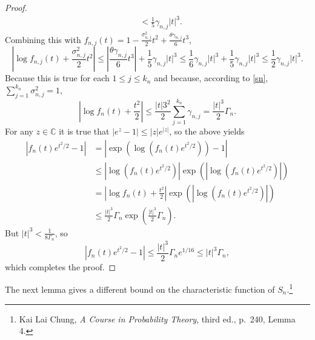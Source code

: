 \documentclass{article}
\theoremstyle{definition}
\begin{document}
\begin{proof}
\begin{align*}
&<\frac{1}{5} \gamma_{n,j} |t|^3.
\end{align*}
Combining this with $f_{n,j}(t) = 1- \frac{\sigma_{n,j}^2}{2} t^2  + \frac{\theta \gamma_{n,j}}{6} t^3$,
\[
\left|\log f_{n,j}(t) + \frac{\sigma_{n,j}^2}{2}t^2 \right| \leq 
\left|\frac{\theta \gamma_{n,j}}{6} t^3 \right| +\frac{1}{5} \gamma_{n,j} |t|^3
\leq \frac{1}{6}\gamma_{n,j} |t|^3 + \frac{1}{5} \gamma_{n,j} |t|^3 \leq 
\frac{1}{2}\gamma_{n,j} |t|^3.
\]
Because this is true for each $1 \leq j \leq k_n$ and because, according to \eqref{sn}, $\sum_{j=1}^{k_n} \sigma_{n,j}^2=1$,
\[
\left|\log f_n(t) + \frac{t^2}{2} \right| \leq \frac{|t|3^2}{2} \sum_{j=1}^{k_n} \gamma_{n,j} = \frac{|t|^3}{2} \Gamma_n.
\]
For any $z \in \mathbb{C}$ it is true that $|e^z - 1| \leq |z| e^{|z|}$, so the above yields
\begin{align*}
|f_n(t) e^{t^2/2} - 1| &= |\exp(\log(f_n(t) e^{t^2/2}))-1|\\
&\leq |\log(f_n(t) e^{t^2/2})| \exp\left(\left|\log(f_n(t) e^{t^2/2})\right|\right)\\
&=\left|\log f_n(t) + \frac{t^2}{2} \right|\exp\left(\left|\log(f_n(t) e^{t^2/2})\right|\right)\\
&\leq
\frac{|t|^3}{2} \Gamma_n   \exp\left(\frac{|t|^3}{2} \Gamma_n \right).
\end{align*}
But $|t|^3 < \frac{1}{8\Gamma_n}$, so
\[
|f_n(t) e^{t^2/2} - 1|  \leq  \frac{|t|^3}{2} \Gamma_n e^{1/16}
\leq |t|^3 \Gamma_n,
\]
which completes the proof.
\end{proof}



The next lemma gives a different bound on the characteristic function of $S_n$.\footnote{Kai Lai Chung,
{\em A Course in Probability Theory}, third ed., p.~240, Lemma 4.}
\end{document}
